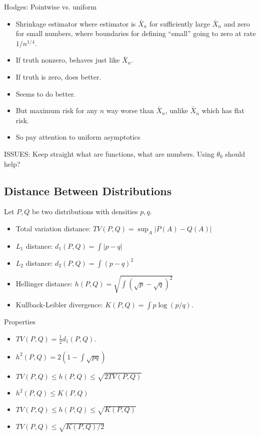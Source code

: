 \documentclass[12pt]{article}
\theoremstyle{plain}
\theoremstyle{definition}
\theoremstyle{remark}
\begin{document}
Hodges: Pointwise vs. uniform
\begin{itemize}
  \item Shrinkage estimator where estimator is $\bar{X}_n$ for
    sufficiently large $\bar{X}_n$ and zero for small numbers,
    where boundaries for defining ``small'' going to zero at rate
    $1/n^{1/4}$.
  \item If truth nonzero, behaves just like $\bar{X}_n$.
  \item If truth is zero, does better.
  \item Seems to do better.
  \item But maximum risk for any $n$ way worse than $\bar{X}_n$, unlike
    $\bar{X}_n$ which has flat risk.
  \item So pay attention to uniform asymptotics
\end{itemize}
ISSUES:
Keep straight what are functions, what are numbers.
Using $\theta_0$ should help?



\clearpage
\subsection{Distance Between Distributions}

Let $P,Q$ be two distributions with densities $p,q$.
\begin{itemize}
  \item Total variation distance:
    $TV(P,Q)=\sup_A|P(A)-Q(A)|$
  \item $L_1$ distance: $d_1(P,Q) = \int |p-q|$
  \item $L_2$ distance: $d_2(P,Q) = \int (p-q)^2$
  \item Hellinger distance: $h(P,Q) = \sqrt{\int (\sqrt{p}-\sqrt{q})^2}$
  \item Kullback-Leibler divergence: $K(P,Q)=\int p\log(p/q)$.
\end{itemize}
Properties
\begin{itemize}
  \item $TV(P,Q)=\frac{1}{2}d_1(P,Q)$.
  \item $h^2(P,Q)=2(1-\int \sqrt{pq})$
  \item $TV(P,Q)\leq h(P,Q)\leq \sqrt{2TV(P,Q)}$
  \item $h^2(P,Q)\leq K(P,Q)$
  \item $TV(P,Q)\leq h(P,Q)\leq \sqrt{K(P,Q)}$
  \item $TV(P,Q)\leq \sqrt{K(P,Q)/2}$
\end{itemize}
\end{document}
